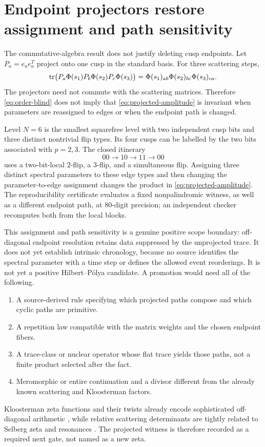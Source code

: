 \section{Endpoint projectors restore assignment and path sensitivity}

The commutative-algebra result does not justify deleting cusp endpoints.  Let
\(P_a=e_ae_a^T\) project onto one cusp in the standard basis.  For three
scattering steps,
\begin{equation}
\operatorname{tr}\bigl(P_a\Phi(s_1)P_b\Phi(s_2)P_c\Phi(s_3)\bigr)
=\Phi(s_1)_{ab}\Phi(s_2)_{bc}\Phi(s_3)_{ca}.
\label{eq:projected-amplitude}
\end{equation}
The projectors need not commute with the scattering matrices.  Therefore
\cref{eq:order-blind} does not imply that
\cref{eq:projected-amplitude} is invariant when parameters are reassigned to
edges or when the endpoint path is changed.

Level \(N=6\) is the smallest squarefree level with two independent cusp bits
and three distinct nontrivial flip types.  Its four cusps can be
labelled by the two bits associated with \(p=2,3\).  The closed itinerary
\[
00\longrightarrow10\longrightarrow11\longrightarrow00
\]
uses a two-bit-local \(2\)-flip, a \(3\)-flip, and a simultaneous flip.
Assigning three distinct spectral parameters to these edge types and then
changing the parameter-to-edge assignment changes the product in
\cref{eq:projected-amplitude}.  The reproducibility certificate evaluates a
fixed nonpalindromic witness, as well as a different endpoint path, at
80-digit precision; an independent checker recomputes both from the local
blocks.

This assignment and path sensitivity is a genuine positive scope boundary:
off-diagonal endpoint resolution retains data suppressed by the unprojected
trace.  It does not yet establish intrinsic chronology, because no source
identifies the spectral parameter with a time step or defines the allowed
event reorderings.  It is not yet a positive Hilbert--P\'olya candidate.  A
promotion would need all of the following.

\begin{enumerate}
\item A source-derived rule specifying which projected paths compose and
which cyclic paths are primitive.
\item A repetition law compatible with the matrix weights and the chosen
endpoint fibers.
\item A trace-class or nuclear operator whose flat trace yields those paths,
not a finite product selected after the fact.
\item Meromorphic or entire continuation and a divisor different from the
already known scattering and Kloosterman factors.
\end{enumerate}

Kloosterman zeta functions and their twists already encode sophisticated
off-diagonal arithmetic \cite{Kiral2016,DiamantisFriedbergStromberg2026},
while relative scattering determinants are tightly related to Selberg zeta
and resonances \cite{BorthwickJudgePerry2005}.  The projected witness is
therefore recorded as a required next gate, not named as a new zeta.
